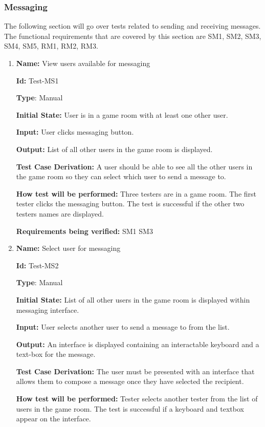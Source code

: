 \documentclass[12pt, titlepage]{article}
\begin{document}
\subsubsection{Messaging}
The following section will go over tests related to sending and receiving messages. The functional requirements that are covered by this section are SM1, SM2, SM3, SM4, SM5, RM1, RM2, RM3.

\begin{enumerate}

\item{\textbf{Name:} View users available for messaging}

\textbf{Id:} Test-MS1

\textbf{Type}: Manual

\textbf{Initial State:} User is in a game room with at least one other user.

\textbf{Input:} User clicks messaging button.

\textbf{Output:} List of all other users in the game room is displayed.

\textbf{Test Case Derivation:}
A user should be able to see all the other users in the game room so they can select which user to send a message to.

\textbf{How test will be performed:}
Three testers are in a game room. The first tester clicks the messaging button. The test is successful if the other two testers names are displayed.

\textbf{Requirements being verified: } SM1 SM3

\item{\textbf{Name:} Select user for messaging}

\textbf{Id:} Test-MS2

\textbf{Type}: Manual

\textbf{Initial State:} List of all other users in the game room is displayed within messaging interface.

\textbf{Input:} User selects another user to send a message to from the list.

\textbf{Output:} An interface is displayed containing an interactable keyboard and a text-box for the message.

\textbf{Test Case Derivation:}
The user must be presented with an interface that allows them to compose a message once they have selected the recipient.

\textbf{How test will be performed:}
Tester selects another tester from the list of users in the game room. The test is successful if a keyboard and textbox appear on the interface.


\end{enumerate}
\end{document}
